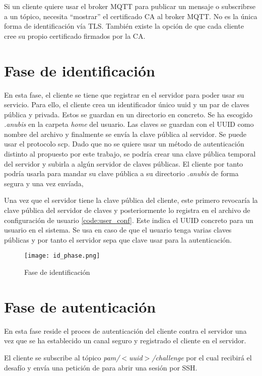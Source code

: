 Si un cliente quiere usar el broker MQTT para publicar un mensaje o subscribrse a un tópico, necesita ``mostrar'' el certificado
CA al broker MQTT. No es la única forma de identificación vía TLS. También existe la opción de que cada cliente
cree su propio certificado firmados por la CA.

\section{Fase de identificación}
\label{sec:id_phase}

En esta fase, el cliente se tiene que registrar en el servidor para poder usar su servicio. Para ello, el cliente crea un 
identificador único \acrfull{uuid} y un par de claves pública y privada. Estos se guardan en un directorio en concreto. Se ha
escogido \textit{.anubis} en la carpeta \textit{home} del usuario. Las claves se guardan con el UUID como nombre del archivo y
finalmente se envía la clave pública al servidor. Se puede usar el protocolo \acrfull{scp}. Dado que no se quiere usar un método
de autenticación distinto al propuesto por este trabajo, se podría crear una clave pública temporal del servidor y subirla a 
algún servidor de claves públicas. El cliente por tanto podría usarla para mandar su clave pública a su directorio \textit{.anubis} 
de forma segura y una vez envíada,  

Una vez que el servidor tiene la clave pública del cliente, este primero revocaría la clave pública del servidor de claves y 
posteriormente lo registra en el archivo de configuración de usuario \ref{code:user_conf}. Este indica el UUID concreto para un 
usuario en el sistema. Se usa en caso de que el usuario tenga varias claves públicas y por tanto el servidor sepa que clave usar 
para la autenticación.

\begin{figure}[H]
    \centering
    \texttt{[image: id\_phase.png]}
    \caption{Fase de identificación}
\end{figure}

\section{Fase de autenticación}

En esta fase reside el proces de autenticación del cliente contra el servidor una vez que se ha establecido un canal seguro y 
registrado el cliente en el servidor.

El cliente se subscribe al tópico \textit{pam/$<$uuid$>$/challenge} por el cual recibirá el desafío y envía una petición de para 
abrir una sesión por SSH. 

